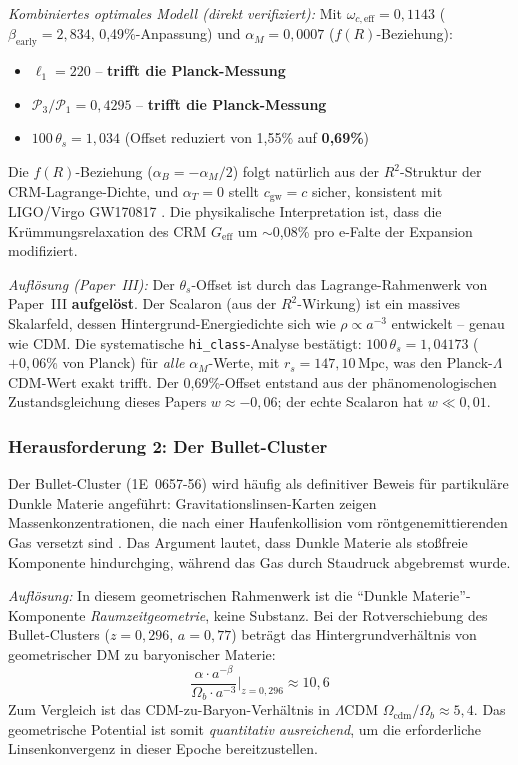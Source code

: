 \documentclass[aps,prd,twocolumn,superscriptaddress,nofootinbib,floatfix]{revtex4-2}
\begin{document}
\textit{Kombiniertes optimales Modell (direkt verifiziert):} Mit $\omega_{c,\mathrm{eff}} = 0{,}1143$ ($\beta_{\mathrm{early}} = 2{,}834$, 0,49\%-Anpassung) und $\alpha_M = 0{,}0007$ ($f(R)$-Beziehung):
\begin{itemize}
\item $\ell_1 = 220$ -- \textbf{trifft die Planck-Messung}
\item $\mathcal{P}_3/\mathcal{P}_1 = 0{,}4295$ -- \textbf{trifft die Planck-Messung}
\item $100\,\theta_s = 1{,}034$ (Offset reduziert von 1,55\% auf \textbf{0,69\%})
\end{itemize}
Die $f(R)$-Beziehung ($\alpha_B = -\alpha_M/2$) folgt natürlich aus der $R^2$-Struktur der CRM-Lagrange-Dichte, und $\alpha_T = 0$ stellt $c_{\mathrm{gw}} = c$ sicher, konsistent mit LIGO/Virgo GW170817 \cite{Abbott2017gw}. Die physikalische Interpretation ist, dass die Krümmungsrelaxation des CRM $G_{\mathrm{eff}}$ um $\sim$0,08\% pro e-Falte der Expansion modifiziert.

\textit{Auflösung (Paper~III):} Der $\theta_s$-Offset ist durch das Lagrange-Rahmenwerk von Paper~III \textbf{aufgelöst}. Der Scalaron (aus der $R^2$-Wirkung) ist ein massives Skalarfeld, dessen Hintergrund-Energiedichte sich wie $\rho \propto a^{-3}$ entwickelt -- genau wie CDM. Die systematische \texttt{hi\_class}-Analyse bestätigt: $100\,\theta_s = 1{,}04173$ ($+0{,}06\%$ von Planck) für \textit{alle} $\alpha_M$-Werte, mit $r_s = 147{,}10\,\text{Mpc}$, was den Planck-$\Lambda$CDM-Wert exakt trifft. Der 0,69\%-Offset entstand aus der phänomenologischen Zustandsgleichung dieses Papers $w \approx -0{,}06$; der echte Scalaron hat $w \ll 0{,}01$.

\subsubsection{Herausforderung 2: Der Bullet-Cluster}

Der Bullet-Cluster (1E~0657-56) wird häufig als definitiver Beweis für partikuläre Dunkle Materie angeführt: Gravitationslinsen-Karten zeigen Massenkonzentrationen, die nach einer Haufenkollision vom röntgenemittierenden Gas versetzt sind \cite{Clowe2006}. Das Argument lautet, dass Dunkle Materie als stoßfreie Komponente hindurchging, während das Gas durch Staudruck abgebremst wurde.

\textit{Auflösung:} In diesem geometrischen Rahmenwerk ist die "`Dunkle Materie"'-Komponente \textit{Raumzeitgeometrie}, keine Substanz. Bei der Rotverschiebung des Bullet-Clusters ($z = 0{,}296$, $a = 0{,}77$) beträgt das Hintergrundverhältnis von geometrischer DM zu baryonischer Materie:
\begin{equation}
\frac{\alpha \cdot a^{-\beta}}{\Omega_b \cdot a^{-3}} \bigg|_{z=0{,}296} \approx 10{,}6
\end{equation}
Zum Vergleich ist das CDM-zu-Baryon-Verhältnis in $\Lambda$CDM $\Omega_{\mathrm{cdm}}/\Omega_b \approx 5{,}4$. Das geometrische Potential ist somit \textit{quantitativ ausreichend}, um die erforderliche Linsenkonvergenz in dieser Epoche bereitzustellen.
\end{document}
